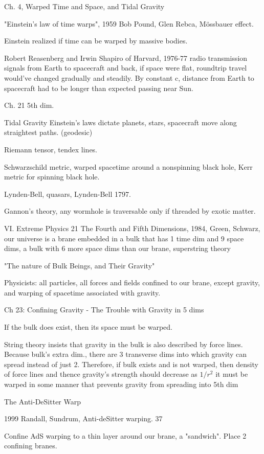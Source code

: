 \documentclass[10pt]{amsart}
\begin{document}
Ch. 4, Warped Time and Space, and Tidal Gravity

"Einstein's law of time warps", 1959 Bob Pound, Glen Rebca, M\"{o}ssbauer effect.

Einstein realized if time can be warped by massive bodies.

Robert Reasenberg and Irwin Shapiro of Harvard, 1976-77 radio transmission signals from Earth to spacecraft and back, if space were flat, roundtrip travel would've changed gradually and steadily. By constant c, distance from Earth to spacecraft had to be longer than expected passing near Sun.

Ch. 21 5th dim.

Tidal Gravity
Einstein's laws dictate planets, stars, spacecraft move along straightest paths. (geodesic)

Riemann tensor, tendex lines.

Schwarzschild metric, warped spacetime around a nonspinning black hole, Kerr metric for spinning black hole.

Lynden-Bell, quasars, Lynden-Bell 1797.

Gannon's theory, any wormhole is traversable only if threaded by exotic matter.

VI. Extreme Physics 21 The Fourth and Fifth Dimensions, 1984, Green, Schwarz, our universe is a brane embedded in a bulk that has 1 time dim and 9 space dims, a bulk with 6 more space dims than our brane, superstring theory

"The nature of Bulk Beings, and Their Gravity"

Physicists: all particles, all forces and fields confined to our brane, except gravity, and warping of spacetime associated with gravity.

Ch 23: Confining Gravity - The Trouble with Gravity in 5 dims

If the bulk does exist, then its space must be warped.

String theory insists that gravity in the bulk is also described by force lines.
Because bulk's extra dim., there are 3 transverse dims into which gravity can spread instead of just 2.
Therefore, if bulk exists and is not warped, then density of force lines and thence gravity's strength should decrease as $1/r^2$
it must be warped in some manner that prevents gravity from spreading into 5th dim

The Anti-DeSitter Warp

1999 Randall, Sundrum, Anti-deSitter warping. 37

Confine AdS warping to a thin layer around our brane, a "sandwich". Place 2 confining branes. 
\end{document}
